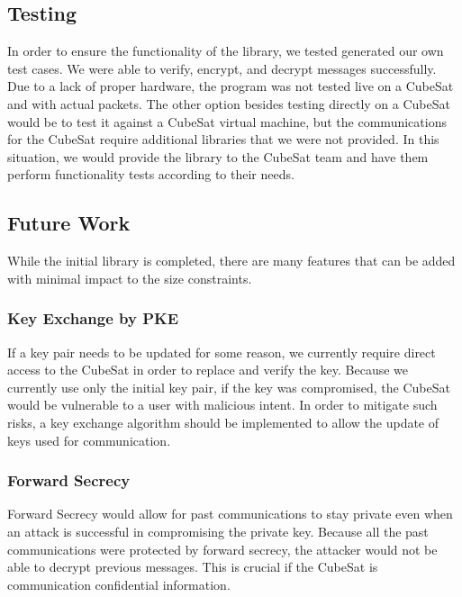 \documentclass[12pt]{article}
\begin{document}
\begin{multicols}{2}
\subsection{Testing}
In order to ensure the functionality of the library, we tested generated our own test cases. We were able to verify, encrypt, and decrypt messages successfully. Due to a lack of proper hardware, the program was not tested live on a CubeSat and with actual packets. The other option besides testing directly on a CubeSat would be to test it against a CubeSat virtual machine, but the communications for the CubeSat require additional libraries that we were not provided. In this situation, we would provide the library to the CubeSat team and have them perform functionality tests according to their needs.
\subsection{Future Work}
While the initial library is completed, there are many features that can be added with minimal impact to the size constraints.
\subsubsection{Key Exchange by PKE}
If a key pair needs to be updated for some reason, we currently require direct access to the CubeSat in order to replace and verify the key. Because we currently use only the initial key pair, if the key was compromised, the CubeSat would be vulnerable to a user with malicious intent. In order to mitigate such risks, a key exchange algorithm should be implemented to allow the update of keys used for communication.
\subsubsection{Forward Secrecy}
Forward Secrecy would allow for past communications to stay private even when an attack is successful in compromising the private key. Because all the past communications were protected by forward secrecy, the attacker would not be able to decrypt previous messages. This is crucial if the CubeSat is communication confidential information.

\end{multicols}
\end{document}

